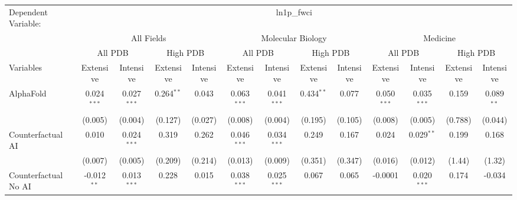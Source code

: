 \begingroup
\centering
\begin{tabular}{lcccccccccccc}
   \tabularnewline \midrule \midrule
   Dependent Variable: & \multicolumn{12}{c}{ln1p\_fwci}\\
 & \multicolumn{4}{c}{All Fields} & \multicolumn{4}{c}{Molecular Biology} & \multicolumn{4}{c}{Medicine} \\
\cmidrule(lr){2-5} \cmidrule(lr){6-9} \cmidrule(lr){10-13}
 & \multicolumn{2}{c}{All PDB} & \multicolumn{2}{c}{High PDB} & \multicolumn{2}{c}{All PDB} & \multicolumn{2}{c}{High PDB} & \multicolumn{2}{c}{All PDB} & \multicolumn{2}{c}{High PDB} \\
\cmidrule(lr){2-3} \cmidrule(lr){4-5} \cmidrule(lr){6-7} \cmidrule(lr){8-9} \cmidrule(lr){10-11} \cmidrule(lr){12-13}
Variables & \multicolumn{1}{c}{Extensive} & \multicolumn{1}{c}{Intensive} & \multicolumn{1}{c}{Extensive} & \multicolumn{1}{c}{Intensive} & \multicolumn{1}{c}{Extensive} & \multicolumn{1}{c}{Intensive} & \multicolumn{1}{c}{Extensive} & \multicolumn{1}{c}{Intensive} & \multicolumn{1}{c}{Extensive} & \multicolumn{1}{c}{Intensive} & \multicolumn{1}{c}{Extensive} & \multicolumn{1}{c}{Intensive} \\
\cmidrule(lr){1-1}\cmidrule(lr){2-2} \cmidrule(lr){3-3} \cmidrule(lr){4-4} \cmidrule(lr){5-5} \cmidrule(lr){6-6} \cmidrule(lr){7-7} \cmidrule(lr){8-8} \cmidrule(lr){9-9} \cmidrule(lr){10-10} \cmidrule(lr){11-11} \cmidrule(lr){12-12} \cmidrule(lr){13-13}
   AlphaFold                                & 0.024$^{***}$ & 0.027$^{***}$  & 0.264$^{**}$ & 0.043   & 0.063$^{***}$ & 0.041$^{***}$ & 0.434$^{**}$ & 0.077   & 0.050$^{***}$ & 0.035$^{***}$ & 0.159   & 0.089$^{**}$\\   
                                            & (0.005)       & (0.004)        & (0.127)      & (0.027) & (0.008)       & (0.004)       & (0.195)      & (0.105) & (0.008)       & (0.005)       & (0.788) & (0.044)\\   
   Counterfactual AI                        & 0.010         & 0.024$^{***}$  & 0.319        & 0.262   & 0.046$^{***}$ & 0.034$^{***}$ & 0.249        & 0.167   & 0.024         & 0.029$^{**}$  & 0.199   & 0.168\\   
                                            & (0.007)       & (0.005)        & (0.209)      & (0.214) & (0.013)       & (0.009)       & (0.351)      & (0.347) & (0.016)       & (0.012)       & (1.44)  & (1.32)\\   
   Counterfactual No AI                     & -0.012$^{**}$ & 0.013$^{***}$  & 0.228        & 0.015   & 0.038$^{***}$ & 0.025$^{***}$ & 0.067        & 0.065   & -0.0001       & 0.020$^{***}$ & 0.174   & -0.034\\   

\end{tabular}
